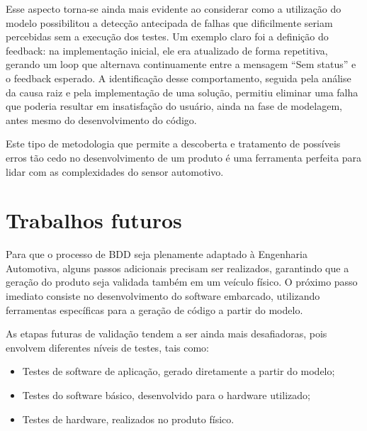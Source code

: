 Esse aspecto torna-se ainda mais evidente ao considerar como a utilização do modelo possibilitou a detecção antecipada de falhas que dificilmente seriam percebidas sem 
a execução dos testes. Um exemplo claro foi a definição do feedback: na implementação inicial, ele era atualizado de forma repetitiva, gerando um loop que alternava 
continuamente entre a mensagem ``Sem status'' e o feedback esperado. A identificação desse comportamento, seguida pela análise da causa raiz e pela implementação de uma 
solução, permitiu eliminar uma falha que poderia resultar em insatisfação do usuário, ainda na fase de modelagem, antes mesmo do desenvolvimento do código.

Este tipo de metodologia que permite a descoberta e tratamento de possíveis erros tão cedo no desenvolvimento de um produto é uma ferramenta perfeita para lidar com as 
complexidades do sensor automotivo.

\section{Trabalhos futuros}

Para que o processo de BDD seja plenamente adaptado à Engenharia Automotiva, alguns passos adicionais precisam ser realizados, garantindo que a geração do 
produto seja validada também em um veículo físico. O próximo passo imediato consiste no desenvolvimento do software embarcado, utilizando ferramentas específicas 
para a geração de código a partir do modelo.

As etapas futuras de validação tendem a ser ainda mais desafiadoras, pois envolvem diferentes níveis de testes, tais como:
\begin{itemize}
    \item Testes de software de aplicação, gerado diretamente a partir do modelo;
    \item Testes do software básico, desenvolvido para o hardware utilizado;
    \item Testes de hardware, realizados no produto físico.
\end{itemize}
